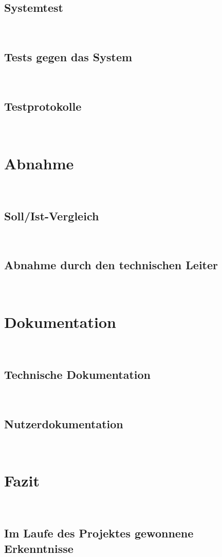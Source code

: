 \documentclass[11pt,toc=sectionentrywithoutdots, 
headheight=44pt, headings=optiontoheadandtoc, hyperfootnotes=false, hypertexnames=false]{scrartcl}
\begin{document}
\subsection{Systemtest}
\blindtext\

\subsection{Tests gegen das System}
\blindtext\

\subsection{Testprotokolle}
\blindtext\

\section{Abnahme}
\blindtext\

\subsection{Soll/Ist-Vergleich}
\blindtext\

\subsection{Abnahme durch den technischen Leiter}
\blindtext\

\section{Dokumentation}
\blindtext\

\subsection{Technische Dokumentation}
\blindtext\

\subsection{Nutzerdokumentation}
\blindtext\

\section{Fazit}
\blindtext\

\subsection{Im Laufe des Projektes gewonnene Erkenntnisse}
\blindtext\
\end{document}
